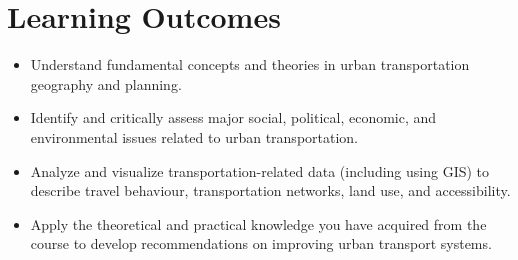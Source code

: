 \documentclass[11pt]{article}
\begin{document}
	
	\section*{Learning Outcomes}
	
	\begin{itemize}
		
		\item Understand fundamental concepts and theories in urban transportation geography and planning.
		
		\item Identify and critically assess major social, political, economic, and environmental issues related to urban transportation.
		
		\item Analyze and visualize transportation-related data (including using GIS) to describe travel behaviour, transportation networks, land use, and accessibility.
		
		\item Apply the theoretical and practical knowledge you have acquired from the course to develop recommendations on improving urban transport systems.
		
	\end{itemize}
	
	
	
	
	
	
	

	
	
	
	
%	
	
	
	
	
	
	
	
		
%		
\end{document}
